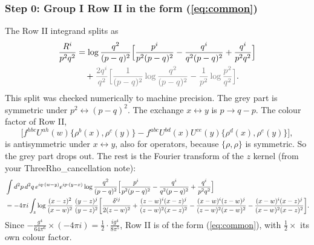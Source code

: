 \documentclass[9pt]{article}
\newcommand{\Gr}[1]{{\color{cX}#1}}
\numberwithin{equation}{section}
\begin{document}
\subsubsection*{Step 0: Group I Row II in the form (\ref{eq:common})}
The Row II integrand splits as
\begin{align}
\frac{R^{i}}{p^{2}q^{2}}&=\log\frac{q^{2}}{(p-q)^{2}}\Big[\frac{p^{i}}{p^{2}(p-q)^{2}}-\frac{q^{i}}{q^{2}(p-q)^{2}}+\frac{q^{i}}{p^{2}q^{2}}\Big]\notag\\
&\quad+\Gr{\frac{2q^{i}}{q^{2}}\Big[\frac{1}{(p-q)^{2}}\log\frac{q^{2}}{(p-q)^{2}}-\frac{1}{p^{2}}\log\frac{p^{2}}{q^{2}}\Big]}.
\end{align}
This split was checked numerically to machine precision. The \Gr{grey} part is symmetric under $p^{2}\leftrightarrow(p-q)^{2}$. The exchange $x\leftrightarrow y$ is $p\to q-p$. The colour factor of Row II,
\begin{equation}
\Big[f^{hbc}U^{ah}(w)\{\rho^{b}(x),\rho^{c}(y)\}-f^{abc}U^{bd}(x)U^{ce}(y)\{\rho^{d}(x),\rho^{e}(y)\}\Big],
\end{equation}
is antisymmetric under $x\leftrightarrow y$, also for operators, because $\{\rho,\rho\}$ is symmetric. So the grey part drops out. The rest is the Fourier transform of the $z$ kernel (from your ThreeRho\_cancellation note):
\begin{align}
&\int d^{2}p\,d^{2}q\,e^{iq\cdot(w-y)}e^{ip\cdot(y-x)}\log\frac{q^{2}}{(p-q)^{2}}\Big[\frac{p^{i}}{p^{2}(p-q)^{2}}-\frac{q^{i}}{q^{2}(p-q)^{2}}+\frac{q^{i}}{p^{2}q^{2}}\Big]\notag\\
&=-4\pi i\int_{z}\log\frac{(x-z)^{2}}{(x-w)^{2}}\,\frac{(y-z)^{j}}{(y-z)^{2}}\bigg[\frac{\delta^{ij}}{2(z-w)^{2}}+\frac{(z-w)^{i}(x-z)^{j}}{(z-w)^{2}(x-z)^{2}}-\frac{(x-w)^{i}(z-w)^{j}}{(z-w)^{2}(x-w)^{2}}-\frac{(x-w)^{i}(x-z)^{j}}{(x-w)^{2}(x-z)^{2}}\bigg].
\end{align}
Since $-\frac{g^{4}}{64\pi^{6}}\times(-4\pi i)=\frac12\cdot\frac{ig^{4}}{8\pi^{5}}$, Row II is of the form (\ref{eq:common}), with $\frac12\times$ its own colour factor.
\end{document}
